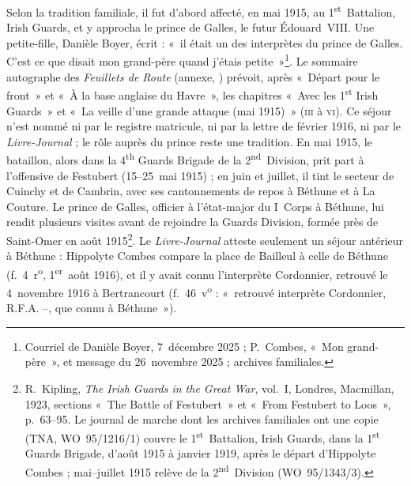 Selon la tradition familiale, il fut d'abord affecté, en mai 1915, au 1\textsuperscript{st}~Battalion, Irish Guards, et y approcha le prince de Galles, le futur Édouard~VIII. Une petite-fille, Danièle Boyer, écrit : «~il était un des interprètes du prince de Galles. C'est ce que disait mon grand-père quand j'étais petite~»\footnote{Courriel de Danièle Boyer, 7~décembre 2025 ; P.~Combes, «~Mon grand-père~», et message du 26~novembre 2025 ; archives familiales.}. Le sommaire autographe des \textit{Feuillets de Route} (annexe, ) prévoit, après «~Départ pour le front~» et «~À la base anglaise du Havre~», les chapitres «~Avec les 1\textsuperscript{st} Irish Guards~» et «~La veille d'une grande attaque (mai 1915)~» (\textsc{iii} à \textsc{vi}). Ce séjour n'est nommé ni par le registre matricule, ni par la lettre de février 1916, ni par le \textit{Livre-Journal} ; le rôle auprès du prince reste une tradition. En mai 1915, le bataillon, alors dans la 4\textsuperscript{th} Guards Brigade de la 2\textsuperscript{nd}~Division, prit part à l'offensive de Festubert (15--25~mai 1915) ; en juin et juillet, il tint le secteur de Cuinchy et de Cambrin, avec ses cantonnements de repos à Béthune et à La Couture. Le prince de Galles, officier à l'état-major du I~Corps à Béthune, lui rendit plusieurs visites avant de rejoindre la Guards Division, formée près de Saint-Omer en août 1915\footnote{R.~Kipling, \textit{The Irish Guards in the Great War}, vol.~I, Londres, Macmillan, 1923, sections «~The Battle of Festubert~» et «~From Festubert to Loos~», p.~63--95. Le journal de marche dont les archives familiales ont une copie (TNA, WO~95/1216/1) couvre le 1\textsuperscript{st}~Battalion, Irish Guards, dans la 1\textsuperscript{st} Guards Brigade, d'août 1915 à janvier 1919, après le départ d'Hippolyte Combes ; mai--juillet 1915 relève de la 2\textsuperscript{nd}~Division (WO~95/1343/3).}. Le \textit{Livre-Journal} atteste seulement un séjour antérieur à Béthune : Hippolyte Combes compare la place de Bailleul à celle de Béthune (f.~4~r\textsuperscript{o}, 1\textsuperscript{er}~août 1916), et il y avait connu l'interprète Cordonnier, retrouvé le 4~novembre 1916 à Bertrancourt (f.~46~v\textsuperscript{o} : «~retrouvé interprète Cordonnier, R.F.A. –, que connu à Béthune~»).

